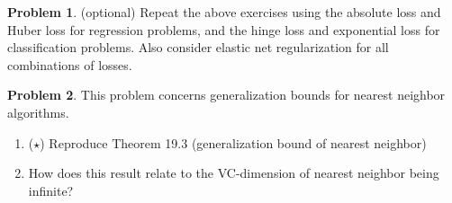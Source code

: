 \documentclass[10pt]{article}
\theoremstyle{definition}
\newtheorem{problem}{Problem}
\begin{document}
\newpage
\begin{problem}
    (optional) 
    Repeat the above exercises using the absolute loss and Huber loss for regression problems, and the hinge loss and exponential loss for classification problems.
    Also consider elastic net regularization for all combinations of losses.
\end{problem}

\newpage
\begin{problem}
    This problem concerns generalization bounds for nearest neighbor algorithms.
    \begin{enumerate}
        \item ($\star$) Reproduce Theorem 19.3 (generalization bound of nearest neighbor)
        \vspace{4.5in}
        \item How does this result relate to the VC-dimension of nearest neighbor being infinite?
    \end{enumerate}
\end{problem}
\end{document}
